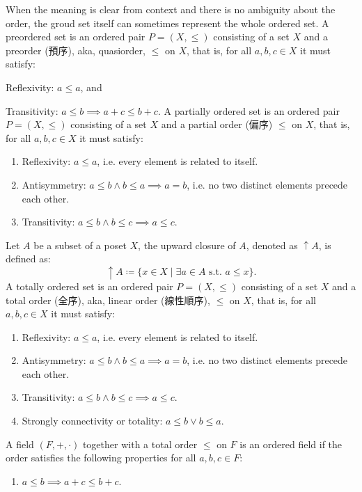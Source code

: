 \documentclass[a4paper,12pt]{article}
\begin{document}
{{{When the meaning is clear from context and there is no ambiguity about the order, the groud set itself can sometimes represent the whole ordered set.
A preordered set is an ordered pair $P=(X,\leq )$ consisting of a set $X$ and a preorder (預序), aka, quasiorder, $\leq$ on $X$, that is, for all $a,b,c\in X$ it must satisfy:
\bit
\item Reflexivity: $a\leq a$, and
\item Transitivity: $a\leq b\implies a+c\leq b+c$.
\eit
{}
A partially ordered set is an ordered pair $P=(X,\leq )$ consisting of a set $X$ and a partial order (偏序) $\leq$ on $X$, that is, for all $a,b,c\in X$ it must satisfy:
\begin{enumerate}
\item Reflexivity: $a\leq a$, i.e. every element is related to itself.
\item Antisymmetry: $a\leq b\land b\leq a\implies a=b$, i.e. no two distinct elements precede each other.
\item Transitivity: $a\leq b\land b\leq c\implies a\leq c$.
\end{enumerate}
Let $A$ be a subset of a poset $X$, the upward closure of $A$, denoted as $\uparrow A$, is defined as:
\[\uparrow A \coloneq \{ x \in X \mid\exists a \in A \text{\ s.t.\ } a \leq x \}.\]
A totally ordered set is an ordered pair $P=(X,\leq )$ consisting of a set $X$ and a total order (全序), aka, linear order (線性順序), $\leq$ on $X$, that is, for all $a,b,c\in X$ it must satisfy:
\begin{enumerate}
\item Reflexivity: $a\leq a$, i.e. every element is related to itself.
\item Antisymmetry: $a\leq b\land b\leq a\implies a=b$, i.e. no two distinct elements precede each other.
\item Transitivity: $a\leq b\land b\leq c\implies a\leq c$.
\item Strongly connectivity or totality: $a\leq b\lor b\leq a$.
\end{enumerate}
A field $(F,+,\cdot)$ together with a total order $\leq$ on $F$ is an ordered field if the order satisfies the following properties for all $a,b,c\in F$:
\begin{enumerate}
\item $a\leq b\implies a+c\leq b+c$.

\end{enumerate}}}}
\end{document}
